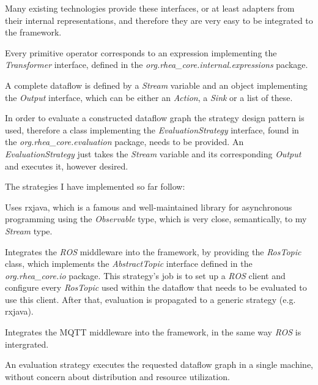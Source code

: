 \documentclass{dithesis}
\begin{document}
Many existing technologies provide these interfaces, or at least adapters from their internal representations, and therefore they are very easy to be integrated to the framework.


Every primitive operator corresponds to an expression implementing the \textit{Transformer} interface, defined in the \textit{org.rhea\_core.internal.expressions} package. 

A complete dataflow is defined by a \textit{Stream} variable and an object implementing the \textit{Output} interface, which can be either an \textit{Action}, a \textit{Sink} or a list of these. 

In order to evaluate a constructed dataflow graph the strategy design pattern is used, therefore a class implementing the \textit{EvaluationStrategy} interface, found in the \textit{org.rhea\_core.evaluation} package, needs to be provided. An \textit{EvaluationStrategy} just takes the \textit{Stream} variable and its corresponding \textit{Output} and executes it, however desired.

The strategies I have implemented so far\cite{rhea} follow:

\begin{description}[style=nextline]
\item[RxJavaEvaluationStrategy] 
Uses rxjava, which is a famous and well-maintained library for asynchronous programming using the \textit{Observable} type, which is very close, semantically, to my \textit{Stream} type.

\item[RosEvaluationStrategy] 
Integrates the \textit{ROS} middleware into the framework, by providing the \textit{RosTopic} class, which implements the \textit{AbstractTopic} interface defined in the \textit{org.rhea\_core.io} package. This strategy's job is to set up a \textit{ROS} client and configure every \textit{RosTopic} used within the dataflow that needs to be evaluated to use this client. After that, evaluation is propagated to a generic strategy (e.g. rxjava).

\item[MqttEvaluationStrategy] 
Integrates the MQTT middleware into the framework, in the same way \textit{ROS} is intergrated.
\end{description}


An evaluation strategy executes the requested dataflow graph in a single machine, without concern about distribution and resource utilization.
\end{document}
